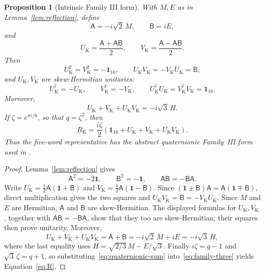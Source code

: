 \documentclass[11pt]{article}
\newtheorem{proposition}[theorem]{Proposition}
\theoremstyle{remark}
\newcommand{\Id}{\mathbf 1}
\begin{document}
\begin{proposition}[Intrinsic Family III form]\label{prop:family-three}
With \(M,E\) as in Lemma~\ref{lem:reflection}, define
\[
  \mathsf A=-i\sqrt2\,M,\qquad \mathsf B=iE,
\]
and
\[
  U_{\mathrm K}=\frac{\mathsf A+\mathsf A\mathsf B}{2},
  \qquad
  V_{\mathrm K}=\frac{\mathsf A-\mathsf A\mathsf B}{2}.
\]
Then
\[
  U_{\mathrm K}^2=V_{\mathrm K}^2=-\Id_{16},\qquad
  U_{\mathrm K}V_{\mathrm K}=-V_{\mathrm K}U_{\mathrm K}=\mathsf B,
\]
and \(U_{\mathrm K},V_{\mathrm K}\) are skew-Hermitian unitaries:
\[
  U_{\mathrm K}^\dagger=-U_{\mathrm K},\qquad
  V_{\mathrm K}^\dagger=-V_{\mathrm K},\qquad
  U_{\mathrm K}^\dagger U_{\mathrm K}
  =V_{\mathrm K}^\dagger V_{\mathrm K}=\Id_{16}.
\]
Moreover,
\begin{equation}
  U_{\mathrm K}+V_{\mathrm K}+U_{\mathrm K}V_{\mathrm K}
  =-i\sqrt3\,H.
  \label{eq:quaternionic-sum}
\end{equation}
If \(\zeta=e^{\pi i/6}\), so that \(q=\zeta^2\), then
\begin{equation}
  R_{\mathrm K}
  =\frac{i\zeta}{2}
   \left(\Id_{16}+U_{\mathrm K}+V_{\mathrm K}
   +U_{\mathrm K}V_{\mathrm K}\right).
  \label{eq:family-three}
\end{equation}
Thus the five-word representative has the abstract quaternionic Family~III
form used in \cite[\S13]{GalindoRowell2026}.
\end{proposition}

\begin{proof}
Lemma~\ref{lem:reflection} gives
\[
  \mathsf A^2=-2\Id,\qquad \mathsf B^2=-\Id,\qquad
  \mathsf A\mathsf B=-\mathsf B\mathsf A.
\]
Write \(U_{\mathrm K}=\frac12\mathsf A(\Id+\mathsf B)\) and
\(V_{\mathrm K}=\frac12\mathsf A(\Id-\mathsf B)\).  Since
\((\Id\pm\mathsf B)\mathsf A=\mathsf A(\Id\mp\mathsf B)\), direct
multiplication gives the two squares and
\(U_{\mathrm K}V_{\mathrm K}=\mathsf B=-V_{\mathrm K}U_{\mathrm K}\).
Since \(M\) and \(E\) are Hermitian, \(\mathsf A\) and \(\mathsf B\) are
skew-Hermitian.  The displayed formulas for \(U_{\mathrm K},V_{\mathrm K}\),
together with \(\mathsf A\mathsf B=-\mathsf B\mathsf A\), show that they too
are skew-Hermitian; their squares then prove unitarity.
Moreover,
\[
  U_{\mathrm K}+V_{\mathrm K}+U_{\mathrm K}V_{\mathrm K}
  =\mathsf A+\mathsf B
  =-i\sqrt2\,M+iE=-i\sqrt3\,H,
\]
where the last equality uses \(H=\sqrt{2/3}\,M-E/\sqrt3\).  Finally
\(i\zeta=q-1\) and \(\sqrt3\,\zeta=q+1\), so
substituting~\eqref{eq:quaternionic-sum} into~\eqref{eq:family-three} yields
Equation~\eqref{eq:R}.
\end{proof}
\end{document}
